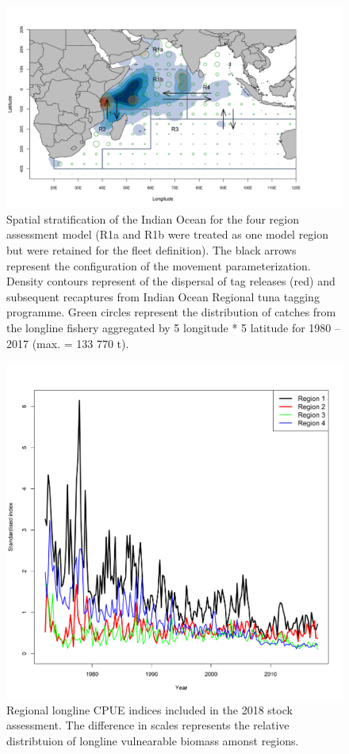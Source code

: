 \documentclass[a4paper]{article}
\begin{document}
\begin{figure}[htbp]
\centering
\includegraphics[width=6in]{map.png}
\caption{Spatial stratification of the Indian Ocean for the four region assessment model (R1a and R1b were treated as one model region but were retained for the fleet definition). The black arrows represent the configuration of the movement parameterization.  Density contours represent of the dispersal of tag releases (red) and subsequent recaptures from Indian Ocean Regional tuna tagging programme. Green circles represent the distribution of catches from the longline fishery aggregated by 5 longitude * 5 latitude for 1980 – 2017 (max. = 133 770 t).}
\label{fig:map}
\end{figure}

\begin{figure}[htbp]
\centering
\includegraphics[width=6in]{ll.png}
\caption{Regional longline CPUE indices included in the 2018 stock assessment. The difference in scales represents the relative distribtuion of longline vulnearable biomass amonst regions.}
\label{fig:ll}
\end{figure}
\end{document}
